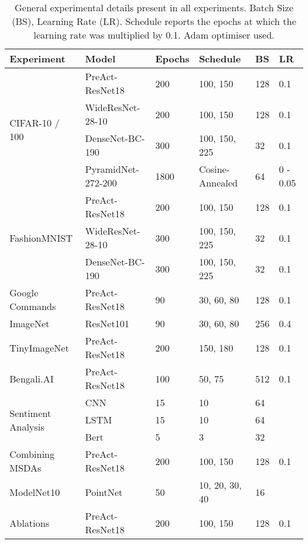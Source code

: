 \documentclass[journal]{IEEEtran}
\begin{document}
\begin{table*}
\centering
\caption{General experimental details present in all experiments. Batch Size (BS), Learning Rate (LR). Schedule reports the epochs at which the learning rate was multiplied by 0.1.  Adam optimiser used. }
\label{tab:exp_dets}
\begin{tabularx}{\textwidth}{XXllll}
\toprule
Experiment & Model & Epochs & Schedule & BS & LR \\
\midrule
\multirow{4}{*}{CIFAR-10 / 100} & PreAct-ResNet18 & 200 & 100, 150 & 128 & 0.1\\
& WideResNet-28-10 & 200 & 100, 150 & 128 & 0.1 \\
& DenseNet-BC-190 & 300 & 100, 150, 225 & 32 & 0.1 \\
& PyramidNet-272-200 & 1800 & Cosine-Annealed & 64 & 0 - 0.05\\
\midrule
\multirow{3}{*}{FashionMNIST} & PreAct-ResNet18 & 200 & 100, 150 & 128 & 0.1\\
& WideResNet-28-10 & 300 & 100, 150, 225 & 32 & 0.1\\
& DenseNet-BC-190 & 300 & 100, 150, 225 & 32 & 0.1\\
\midrule
Google Commands & PreAct-ResNet18 & 90 & 30, 60, 80 & 128 & 0.1\\
\midrule
ImageNet & ResNet101 & 90 & 30, 60, 80 & 256 & 0.4\\
\midrule
TinyImageNet & PreAct-ResNet18 & 200 & 150, 180 & 128 & 0.1\\
\midrule
Bengali.AI & PreAct-ResNet18 & 100 & 50, 75 & 512 & 0.1\\
\midrule
\multirow{3}{*}{Sentiment Analysis} & CNN & 15 & 10 & 64 &  \\
& LSTM & 15 & 10 & 64 &  \\
& Bert & 5 & 3 & 32 &  \\
\midrule
Combining MSDAs & PreAct-ResNet18 & 200 & 100, 150 & 128 & 0.1 \\
\midrule
ModelNet10 & PointNet & 50 & 10, 20, 30, 40 & 16 &  \\
\midrule
Ablations & PreAct-ResNet18 & 200 & 100, 150 & 128 & 0.1\\
\bottomrule
\end{tabularx}
\end{table*}






\end{document}
